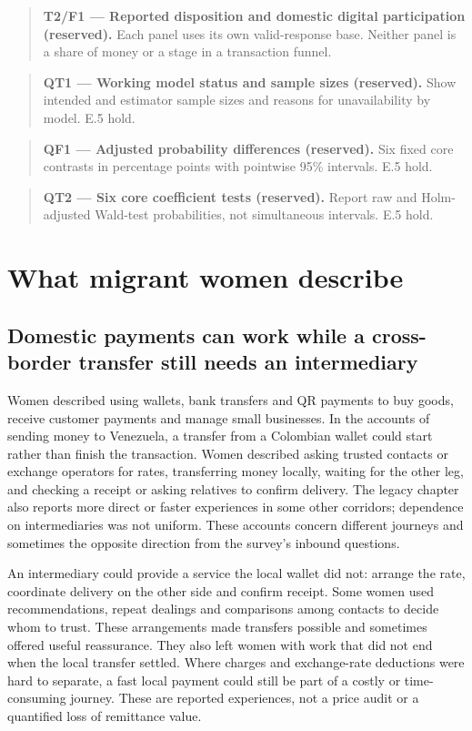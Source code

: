 \documentclass[12pt]{article}
\newcommand{\exhibitplaceholder}[3]{%
  \begin{quote}\small
    \textbf{#1 --- #2 (reserved).} #3
  \end{quote}%
}
\begin{document}
\exhibitplaceholder{T2/F1}{Reported disposition and domestic digital participation}{Each panel uses its own valid-response base. Neither panel is a share of money or a stage in a transaction funnel.}
\exhibitplaceholder{QT1}{Working model status and sample sizes}{Show intended and estimator sample sizes and reasons for unavailability by model. E.5 hold.}
\exhibitplaceholder{QF1}{Adjusted probability differences}{Six fixed core contrasts in percentage points with pointwise 95\% intervals. E.5 hold.}
\exhibitplaceholder{QT2}{Six core coefficient tests}{Report raw and Holm-adjusted Wald-test probabilities, not simultaneous intervals. E.5 hold.}

\section{What migrant women describe}
\subsection{Domestic payments can work while a cross-border transfer still needs an intermediary}

Women described using wallets, bank transfers and QR payments to buy goods, receive customer payments and manage small businesses. In the accounts of sending money to Venezuela, a transfer from a Colombian wallet could start rather than finish the transaction. Women described asking trusted contacts or exchange operators for rates, transferring money locally, waiting for the other leg, and checking a receipt or asking relatives to confirm delivery. The legacy chapter also reports more direct or faster experiences in some other corridors; dependence on intermediaries was not uniform. These accounts concern different journeys and sometimes the opposite direction from the survey's inbound questions.

An intermediary could provide a service the local wallet did not: arrange the rate, coordinate delivery on the other side and confirm receipt. Some women used recommendations, repeat dealings and comparisons among contacts to decide whom to trust. These arrangements made transfers possible and sometimes offered useful reassurance. They also left women with work that did not end when the local transfer settled. Where charges and exchange-rate deductions were hard to separate, a fast local payment could still be part of a costly or time-consuming journey. These are reported experiences, not a price audit or a quantified loss of remittance value.
\end{document}
